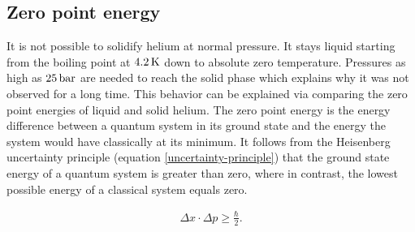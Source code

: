 \documentclass[parskip,12pt,headsepline,a4paper] {scrbook}
\begin{document}
\subsection{Zero point energy}
\vspace{-1\baselineskip}
It is not possible to solidify helium at normal pressure. It stays liquid starting from the boiling point at $\unit[4.2]{K}$ down to absolute zero temperature. Pressures as high as $\unit[25]{bar}$ are needed to reach the solid phase which explains why it was not observed for a long time. This behavior can be explained via comparing the zero point energies of liquid and solid helium. The zero point energy is the energy difference between a quantum system in its ground state and the energy the system would have classically at its minimum. It follows from the Heisenberg uncertainty principle (equation \ref{uncertainty-principle}) that the ground state energy of a quantum system is greater than zero, where in contrast, the lowest possible energy of a classical system equals zero.

\begin{align}  \label{uncertainty-principle}
\Delta x \cdot \Delta p \ge \frac{\hbar}{2} .
\end{align}
\end{document}
